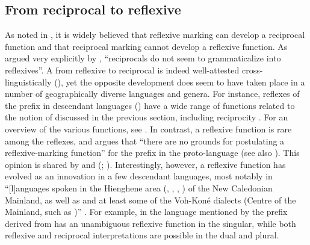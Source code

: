 \subsection{From reciprocal to reflexive} \label{diachrony:recp2refl}
As noted in , it is widely believed that reflexive marking can develop a reciprocal function and that reciprocal marking cannot develop a reflexive function. As argued very explicitly by \cite[216]{heine:miyashita:2008}, “reciprocals do not seem to grammaticalize into reflexives”. A  from reflexive to reciprocal is indeed well-attested cross-linguistically (), yet the opposite development does seem to have taken place in a number of geographically diverse languages and genera. For instance, reflexes of the  prefix  \citep[150ff.]{pawley:1973} in descendant languages () have a wide range of functions related to the notion of  discussed in the previous section, including reciprocity \citep{lichtenberk:2000}. For an overview of the various functions, see \cite[28]{bril:2005}. In contrast, a reflexive function is rare among the reflexes, and \cite[32]{lichtenberk:2000} argues that “there are no grounds for postulating a reflexive-marking function” for the prefix  in the proto-language (see also \citeyear[181]{lichtenberk:1991}). This opinion is shared by \cite[32]{bril:2005} and \citeauthor{moyse-faurie:2008} (\citeyear[106]{moyse-faurie:2008}; \citeyear[108]{moyse-faurie:2017}). Interestingly, however, a reflexive function has evolved as an innovation in a few descendant languages, most notably in “[l]anguages spoken in the Hienghene area (, , , ) of the New Caledonian Mainland, as well as  and at least some of the Voh-Koné dialects (Centre of the Mainland, such as )” \citep[122]{moyse-faurie:2017}. For example, in the  language mentioned by \citeauthor{moyse-faurie:2017} the prefix  derived from   has an unambiguous reflexive function in the singular, while both reflexive and reciprocal interpretations are possible in the dual and plural. 

